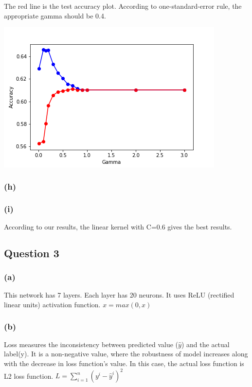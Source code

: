 \documentclass[12pt]{article}
\begin{document}
{The red line is the test accuracy plot. According to one-standard-error rule, the appropriate gamma should be 0.4. 
\begin{center}
\includegraphics[scale=0.8]{P2/cross_validation_rbf_gamma.png}
\end{center}

\subsubsection*{(h)}

\subsubsection*{(i)}
According to our results, the linear kernel with C=0.6 gives the best results. 


\subsection*{Question 3}
\subsubsection*{(a)}
This network has 7 layers. Each layer has 20 neurons. It uses ReLU (rectified linear units) activation function. $x = max(0, x)$

\subsubsection*{(b)}
Loss measures the inconsistency between predicted value ($\hat{y}$) and the actual label(y). It is a non-negative value, where the robustness of model increases along with the decrease in loss function's value. In this case, the actual loss function is L2 loss function. $L = \sum_{i=1}^n(y^i-\hat{y}^i)^2$

}
\end{document}
